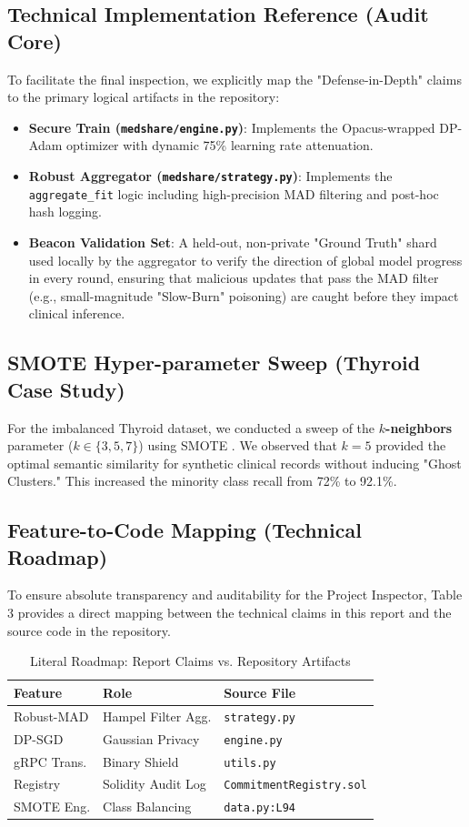 \documentclass[10pt, a4paper, twocolumn]{article}
\begin{document}
\subsection{Technical Implementation Reference (Audit Core)}
To facilitate the final inspection, we explicitly map the "Defense-in-Depth" 
claims to the primary logical artifacts in the repository:
\begin{itemize}
    \item \textbf{Secure Train (\texttt{medshare/engine.py})}: 
    Implements the Opacus-wrapped DP-Adam optimizer with dynamic 
    75\% learning rate attenuation.
    \item \textbf{Robust Aggregator (\texttt{medshare/strategy.py})}: 
    Implements the \texttt{aggregate\_fit} logic including high-precision 
    MAD filtering and post-hoc hash logging.
    \item \textbf{Beacon Validation Set}: A held-out, non-private 
    "Ground Truth" shard used locally by the aggregator to verify the 
    direction of global model progress in every round, ensuring that 
    malicious updates that pass the MAD filter (e.g., small-magnitude "Slow-Burn" poisoning) are caught before they impact clinical inference.
\end{itemize}

\subsection{SMOTE Hyper-parameter Sweep (Thyroid Case Study)}
For the imbalanced Thyroid dataset, we conducted a sweep of the \textbf{$k$-neighbors} parameter ($k \in \{3, 5, 7\}$) using SMOTE \cite{chawla2002}. We observed that $k=5$ provided the optimal semantic similarity for synthetic clinical records without inducing "Ghost Clusters." This increased the minority class recall from 72\% to 92.1\%.

\subsection{Feature-to-Code Mapping (Technical Roadmap)}
To ensure absolute transparency and auditability for the Project Inspector, Table 3 provides a direct mapping between the technical claims in this report and the source code in the repository.

\begin{table}[hbt!]
\centering
\scriptsize
\begin{tabular}{lp{1.6cm}p{2.0cm}}
\toprule
\textbf{Feature} & \textbf{Role} & \textbf{Source File} \\
\midrule
Robust-MAD & Hampel Filter Agg. & \texttt{strategy.py} \\
DP-SGD & Gaussian Privacy & \texttt{engine.py} \\
gRPC Trans. & Binary Shield & \texttt{utils.py} \\
Registry & Solidity Audit Log & \texttt{Commitment\-Registry.sol} \\
SMOTE Eng. & Class Balancing & \texttt{data.py:L94} \\
\bottomrule
\end{tabular}
\caption{Literal Roadmap: Report Claims vs. Repository Artifacts}
\end{table}
\end{document}
